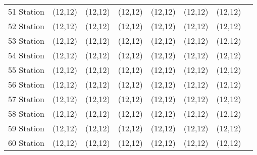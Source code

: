 \documentclass{article}
\begin{document}
\begin{multicols*}{2}
\begin {minipage}{\linewidth}
\begin{supertabular}{l*{6}{>{\centering\arraybackslash}p{1em}}c@{}}
		51 Station  & \framebox(12,12){} & \framebox(12,12){} & \framebox(12,12){} & \framebox(12,12){} & \framebox(12,12){} & \framebox(12,12){} &\\
		52 Station  & \framebox(12,12){} & \framebox(12,12){} & \framebox(12,12){} & \framebox(12,12){} & \framebox(12,12){} & \framebox(12,12){} &\\
		53 Station  & \framebox(12,12){} & \framebox(12,12){} & \framebox(12,12){} & \framebox(12,12){} & \framebox(12,12){} & \framebox(12,12){} &\\
		54 Station  & \framebox(12,12){} & \framebox(12,12){} & \framebox(12,12){} & \framebox(12,12){} & \framebox(12,12){} & \framebox(12,12){} &\\
		55 Station  & \framebox(12,12){} & \framebox(12,12){} & \framebox(12,12){} & \framebox(12,12){} & \framebox(12,12){} & \framebox(12,12){} &\\
		56 Station  & \framebox(12,12){} & \framebox(12,12){} & \framebox(12,12){} & \framebox(12,12){} & \framebox(12,12){} & \framebox(12,12){} &\\
		57 Station  & \framebox(12,12){} & \framebox(12,12){} & \framebox(12,12){} & \framebox(12,12){} & \framebox(12,12){} & \framebox(12,12){} &\\
		58 Station  & \framebox(12,12){} & \framebox(12,12){} & \framebox(12,12){} & \framebox(12,12){} & \framebox(12,12){} & \framebox(12,12){} &\\
		59 Station  & \framebox(12,12){} & \framebox(12,12){} & \framebox(12,12){} & \framebox(12,12){} & \framebox(12,12){} & \framebox(12,12){} &\\
		60 Station  & \framebox(12,12){} & \framebox(12,12){} & \framebox(12,12){} & \framebox(12,12){} & \framebox(12,12){} & \framebox(12,12){}\\
	\end{supertabular}
	\end{minipage}
	\end{multicols*}
	
\end{document}
